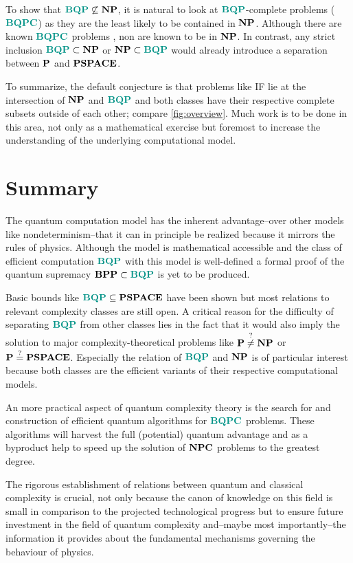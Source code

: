 To show that $\BQP\not\subseteq\NP$, it is natural to look at $\BQP$-complete problems ($\BQPC$) as they are the least likely to be contained in $\NP$.
Although there are known $\BQPC$ problems \cite{pawel_shengyu_2006}, non are known to be in $\NP$.
In contrast, any strict inclusion $\BQP\subset\NP$ or $\NP\subset\BQP$ would already introduce a separation between $\P$ and $\PSPACE$.

To summarize, the default conjecture is that problems like \ac{IF} lie at the intersection of $\NP$ and $\BQP$ and both classes have their respective complete subsets outside of each other; compare \cref{fig:overview}.
Much work is to be done in this area, not only as a mathematical exercise but foremost to increase the understanding of the underlying computational model.

\section{Summary}
\label{Summary}

The quantum computation model has the inherent advantage--over other models like nondeterminism--that it can in principle be realized because it mirrors the rules of physics.
Although the model is mathematical accessible and the class of efficient computation $\BQP$ with this model is well-defined a formal proof of the quantum supremacy $\BPP\subset\BQP$ is yet to be produced.

Basic bounds like $\BQP\subseteq\PSPACE$ have been shown but most relations to relevant complexity classes are still open.
A critical reason for the difficulty of separating $\BQP$ from other classes lies in the fact that it would also imply the solution to major complexity-theoretical problems like $\P\overset{?}{\neq}\NP$ or $\P\overset{?}{=}\PSPACE$.
Especially the relation of $\BQP$ and $\NP$ is of particular interest because both classes are the efficient variants of their respective computational models.

An more practical aspect of quantum complexity theory is the search for and construction of efficient quantum algorithms for $\BQPC$ problems.
These algorithms will harvest the full (potential) quantum advantage and as a byproduct help to speed up the solution of $\NPC$ problems to the greatest degree.

The rigorous establishment of relations between quantum and classical complexity is crucial, not only because the canon of knowledge on this field is small in comparison to the projected technological progress but to ensure future investment in the field of quantum complexity and--maybe most importantly--the information it provides about the fundamental mechanisms governing the behaviour of physics.